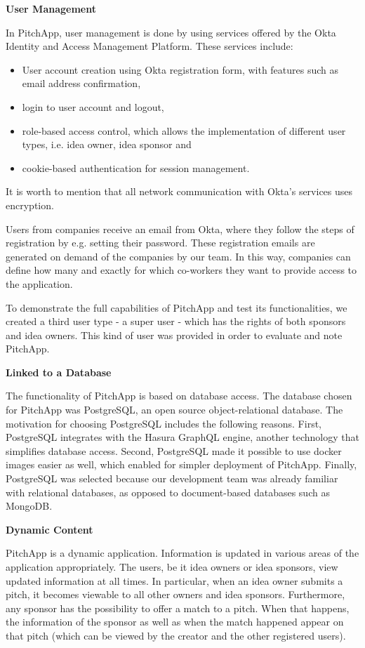 \textbf{User Management}

In PitchApp, user management is done by using services offered by the Okta Identity and Access Management Platform. These services include:

\begin{itemize}
	\item User account creation using Okta registration form, with features such as email address confirmation,
	\item login to user account and logout,
	\item role-based access control, which allows the implementation of different user types, i.e. idea owner, idea sponsor and
	\item cookie-based authentication for session management.
\end{itemize}

It is worth to mention that all network communication with Okta’s services uses encryption.

Users from companies receive an email from Okta, where they follow the steps of registration by e.g. setting their password. These registration emails are generated on demand of the companies by our team. In this way, companies can define how many and exactly for which co-workers they want to provide access to the application.

To demonstrate the full capabilities of PitchApp and test its functionalities, we created a third user type - a super user - which has the rights of both sponsors and idea owners. This kind of user was provided in order to evaluate and note PitchApp.

\textbf{Linked to a Database}

The functionality of PitchApp is based on database access. The database chosen for PitchApp was PostgreSQL, an open source object-relational database. The motivation for choosing PostgreSQL includes the following reasons.
First, PostgreSQL integrates with the Hasura GraphQL engine, another technology that simplifies database access. Second, PostgreSQL made it possible to use docker images easier as well, which enabled for simpler deployment of PitchApp. Finally, PostgreSQL was selected because our development team was already familiar with relational databases, as opposed to document-based databases such as MongoDB.

\textbf{Dynamic Content}

PitchApp is a dynamic application. Information is updated in various areas of the application appropriately. The users, be it idea owners or idea sponsors, view updated information at all times.
In particular, when an idea owner submits a pitch, it becomes viewable to all other owners and idea sponsors. Furthermore, any sponsor has the possibility to offer a match to a pitch. When that happens, the information of the sponsor as well as when the match happened appear on that pitch (which can be viewed by the creator and the other registered users).

